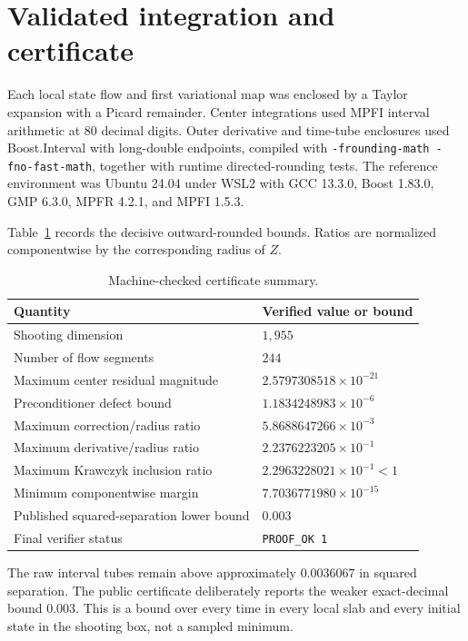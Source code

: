 \documentclass[11pt]{article}
\begin{document}
\section{Validated integration and certificate}

Each local state flow and first variational map was enclosed by a Taylor expansion with a Picard remainder. Center integrations used MPFI interval arithmetic at 80 decimal digits. Outer derivative and time-tube enclosures used Boost.Interval with long-double endpoints, compiled with \texttt{-frounding-math -fno-fast-math}, together with runtime directed-rounding tests. The reference environment was Ubuntu 24.04 under WSL2 with GCC 13.3.0, Boost 1.83.0, GMP 6.3.0, MPFR 4.2.1, and MPFI 1.5.3.

Table~\ref{tab:certificate} records the decisive outward-rounded bounds. Ratios are normalized componentwise by the corresponding radius of $Z$.

\begin{table}[ht]
\centering
\caption{Machine-checked certificate summary.}
\label{tab:certificate}
\begin{tabular}{@{}ll@{}}
\toprule
Quantity & Verified value or bound \\
\midrule
Shooting dimension & $1{,}955$ \\
Number of flow segments & $244$ \\
Maximum center residual magnitude & $2.5797308518\times10^{-21}$ \\
Preconditioner defect bound & $1.1834248983\times10^{-6}$ \\
Maximum correction/radius ratio & $5.8688647266\times10^{-3}$ \\
Maximum derivative/radius ratio & $2.2376223205\times10^{-1}$ \\
Maximum Krawczyk inclusion ratio & $2.2963228021\times10^{-1}<1$ \\
Minimum componentwise margin & $7.7036771980\times10^{-15}$ \\
Published squared-separation lower bound & $0.003$ \\
Final verifier status & \texttt{PROOF\_OK 1} \\
\bottomrule
\end{tabular}
\end{table}

The raw interval tubes remain above approximately $0.0036067$ in squared separation. The public certificate deliberately reports the weaker exact-decimal bound $0.003$. This is a bound over every time in every local slab and every initial state in the shooting box, not a sampled minimum.
\end{document}

